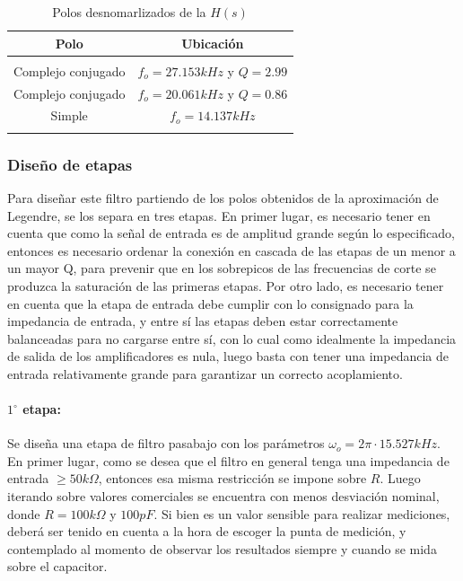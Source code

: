 \begin{table}[H]
    \centering
    \begin{tabular}{c | c}
        Polo & Ubicaci\'on \\
        \hline \\
        Complejo conjugado & $f_o = 27.153kHz$ y $Q = 2.99$ \\
        Complejo conjugado & $f_o = 20.061kHz$ y $Q = 0.86$\\
        Simple & $f_o = 14.137kHz$\\
        \\ \hline
    \end{tabular}
    \caption{Polos desnomarlizados de la $H(s)$}
\end{table}

\subsubsection{Dise\~no de etapas}
Para dise\~nar este filtro partiendo de los polos obtenidos de la aproximaci\'on de Legendre, se los separa en tres etapas. En primer lugar, es necesario tener en cuenta que como la se\~nal de entrada
es de amplitud grande seg\'un lo especificado, entonces es necesario ordenar la conexi\'on en cascada de las etapas de un menor a un mayor Q, para prevenir que en los sobrepicos de las frecuencias de corte
se produzca la saturaci\'on de las primeras etapas. Por otro lado, es necesario tener en cuenta que la etapa de entrada debe cumplir con lo consignado para la impedancia de entrada,
y entre s\'i las etapas deben estar correctamente balanceadas para no cargarse entre s\'i, con lo cual como idealmente la impedancia de salida de los amplificadores es nula, luego basta con tener una impedancia de entrada
relativamente grande para garantizar un correcto acoplamiento.

\paragraph{$1^{\circ}$ etapa:} Se dise\~na una etapa de filtro pasabajo con los par\'ametros $\omega_o = 2 \pi \cdot 15.527 kHz$. En primer lugar, como se desea que el filtro en general tenga una impedancia de entrada $\geq 50k \Omega$, entonces
esa misma restricci\'on se impone sobre $R$. Luego iterando sobre valores comerciales se encuentra con menos desviaci\'on nominal, donde $R = 100k \Omega$ y $100pF$. Si bien es un valor sensible para realizar mediciones, deber\'a ser tenido en cuenta
a la hora de escoger la punta de medici\'on, y contemplado al momento de observar los resultados siempre y cuando se mida sobre el capacitor.

